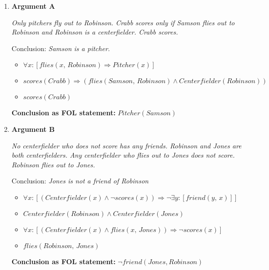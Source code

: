 \begin{enumerate}[label=\alph*)]
    \item \textbf{Argument A} 
    
        \textit{Only pitchers fly out to Robinson. Crabb scores only if Samson flies out to Robinson and Robinson is a
        centerfielder. Crabb scores.}

        Conclusion: \textit{Samson is a pitcher.}

        \begin{itemize}
            \item $\forall x: \left[ flies(x,\, Robinson) \Longrightarrow Pitcher(x) \right]$
            \item $scores(Crabb) \Longrightarrow (flies(Samson,\, Robinson) \land Centerfielder(Robinson))$
            \item $scores(Crabb)$
        \end{itemize}
        \vspace{0.5cm}

        \textbf{Conclusion as FOL statement:} $Pitcher(Samson)$

        \vspace{0.5cm}

    \item \textbf{Argument B}
    
        \textit{No centerfielder who does not score has any friends. Robinson and Jones are both centerfielders. Any
        centerfielder who flies out to Jones does not score. Robinson flies out to Jones.}

        Conclusion: \textit{Jones is not a friend of Robinson}

        \begin{itemize}
            \item $\forall x: \left[ (Centerfielder(x) \land \neg scores(x)) \Longrightarrow \neg \exists y: \left[friend(y,\,x)\right] \right]$
            \item $Centerfielder(Robinson) \land Centerfielder(Jones)$
            \item $\forall x: \left[ (Centerfielder(x) \land flies(x,\, Jones)) \Longrightarrow \neg scores(x) \right]$
            \item $flies(Robinson,\,Jones)$
        \end{itemize}

        \vspace{0.5cm}

        \textbf{Conclusion as FOL statement:} $\neg friend(Jones, Robinson)$

        \vspace{0.5cm}

\end{enumerate}

